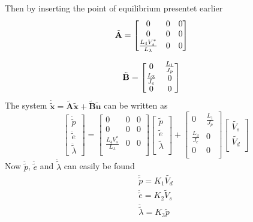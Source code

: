 Then by inserting the point of equilibrium presentet earlier
    \begin{align}
    \tilde{\textbf{A}} &=\begin{bmatrix}{\label{A matrix sol}}
        0 & 0  & 0\\
        0 & 0  & 0\\
        \frac{L_4 V_s^*}{L_\lambda} & 0  & 0\\ %
    \end{bmatrix}
    \end{align}

    \begin{align}
    \tilde{\textbf{B}} &= \begin{bmatrix}{\label{B matrix sol}}
        0 & \frac{L_1}{J_p}\\
        \frac{L_3}{J_e} & 0\\
        0 & 0\\
    \end{bmatrix}
    \end{align}
The system $\dot{\tilde{\textbf{x}}} = {\tilde{\textbf{A}} \tilde{\textbf{x}}} + {\tilde{\textbf{B}} \tilde{\textbf{u}}}$ can be written as
\[
\begin{bmatrix}
    \ddot{\tilde p} \\
    \ddot{\tilde e}\\
    \ddot{\tilde \lambda}
\end{bmatrix}
=
\begin{bmatrix}
    0 & 0  & 0\\
    0 & 0  & 0\\
    \frac{L_4 V_s^*}{L_\lambda} & 0  & 0\\ %
\end{bmatrix}
\begin{bmatrix}
    \tilde {p} \\
    \tilde{e}\\
    \tilde{\lambda}\\
 \end{bmatrix}
 + 
 \begin{bmatrix}
     0 & \frac{L_1}{J_p}\\
    \frac{L_3}{J_e} & 0\\
    0 & 0\\
\end{bmatrix}
\begin{bmatrix}
    \tilde{V_s}\\
    \tilde{V_d}\\ 
\end{bmatrix}
\]
Now $\ddot{\tilde{p}}$, $\ddot{\tilde{e}}$ and $\ddot{\tilde{\lambda}}$ can easily be found
\begin{subequations}
    \begin{gather}
        \ddot{\tilde{p}} =  K_1 \tilde{V_d}\label{6a}\\
        \ddot{\tilde{e}} = K_2 \tilde{V}_s\label{6b}\\
        \ddot{\tilde{\lambda}} = K_3 \tilde{p} \label{6c}
    \end{gather}
\end{subequations}

